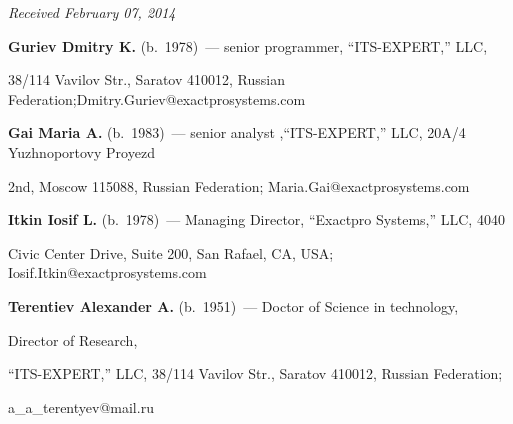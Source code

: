 \hfill{\small\textit{Received February 07, 2014}}





\vspace*{-6pt}





   \Contr





   \noindent


   \textbf{Guriev Dmitry K.} (b.\ 1978)~--- senior programmer, ``ITS-EXPERT,'' LLC,


   38/114 Vavilov Str., Saratov 410012, Russian Federation;\linebreak Dmitry.Guriev@exactprosystems.com





\vspace*{3pt}





\noindent


\textbf{Gai Maria A.} (b.\ 1983)~--- senior analyst ,``ITS-EXPERT,'' LLC, 20A/4 Yuzhnoportovy Proyezd


2nd,  Moscow 115088, Russian Federation; Maria.Gai@exactprosystems.com





  \vspace*{3pt}





  \noindent


  \textbf{Itkin Iosif L.} (b.\ 1978)~---  Managing Director, ``Exactpro Systems,'' LLC, 4040


Civic Center Drive, Suite 200, San Rafael, CA,  USA; Iosif.Itkin@exactprosystems.com





\vspace*{3pt}





\noindent


\textbf{Terentiev Alexander A.} (b.\ 1951)~--- Doctor of Science in technology,


Director of Research,


``ITS-EXPERT,'' LLC, 38/114 Vavilov Str., Saratov 410012, Russian Federation;


a\_a\_terentyev@mail.ru








\label{end\stat}





\renewcommand{\bibname}{\protect\rmfamily Литература}





